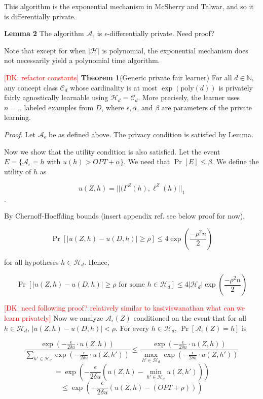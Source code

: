 \documentclass[format = sigconf]{acmart}
\newcommand{\dk}[1]{\textcolor{red}{[DK: #1]}}
\newcommand{\A}{\mathcal{A}}
\renewcommand{\H}{\mathcal{H}}
\renewcommand{\C}{\mathcal{C}}
\newcommand{\1}{\mathbbm{1}}
\newcommand{\del}{\delta}
\newcommand{\eps}{\epsilon}
\theoremstyle{definition}
\begin{document}
This algorithm is the exponential mechanism in McSherry and Talwar, and so it is differentially private.

{\bf Lemma 2} The algorithm $\A_\eps$ is $\eps$-differentially private.
Need proof?

Note that except for when $|\H|$ is polynomial, the exponential mechanism does not necessarily yield a polynomial time algorithm.

\dk{refactor constants}
{\bf Theorem 1}(Generic private fair learner) For all $d \in \mathbb{N}$, any concept class $\mathcal{C}_d$ whose cardinality is at most $\exp(\text{poly}(d))$ is privately fairly agnostically learnable using $\H_d = \C_d$. More precisely, the learner uses $n = ..$ labeled examples from $D$, where $\eps, \alpha$, and $\beta$ are parameters of the private learning.

{\it Proof.} Let $\A_{\eps}$ be as defined above. The privacy condition is satisfied by Lemma.

Now we show that the utility condition is also satisfied. Let the event $E = \{\A_{\eps} = h \text{ with } u(h) > OPT + \alpha\}$. We need that $\Pr[E] \leq \beta$. We define the utility of $h$ as

$$u(Z,h) = ||(\Gamma^Z(h), \ell^Z(h)||_{1}$$.

By Chernoff-Hoeffding bounds (insert appendix ref. see below proof for now),



$$\Pr[|u(Z,h) - u(D,h)| \geq \rho] \leq 4\exp(\frac{-\rho^2n}{2})$$

for all hypotheses $h \in \H_d$. Hence,

$$\Pr[|u(Z,h) - u(D,h)| \geq \rho \text{ for some } h \in \H_d] \leq 4|\H_d|\exp(\frac{-\rho^2n}{2})$$

\dk{need following proof? relatively similar to kasiviswanathan what can we learn privately}
Now we analyze $\A_\eps(Z)$ conditioned on the event that for all $h\in \H_d$, $|u(Z,h) - u(D,h)| < \rho$. For every $h \in \H_d$, $\Pr[\A_\eps(Z) = h]$ is

$$\frac{\exp(-\frac{\eps}{2\del u} \cdot u(Z,h))}{\sum_{h'\in\H_d}\exp(-\frac{\eps}{2\del u} \cdot u(Z,h'))} \leq \frac{\exp(-\frac{\eps}{2\del u} \cdot u(Z,h))}{\max_{h'\in\H_d}\exp(-\frac{\eps}{2\del u} \cdot u(Z,h'))} $$
$$= \exp(-\frac{\eps}{2\del u}(u(Z,h) - \min_{h'\in\H_d}u(Z,h')))$$
$$\leq \exp(-\frac{\eps}{2\del u}(u(Z,h) - (OPT + \rho)))$$
\end{document}
